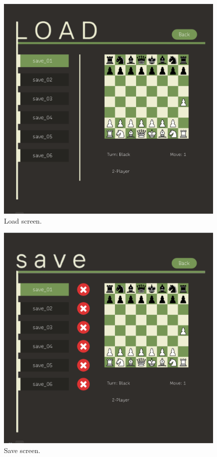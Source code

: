 \documentclass[a4paper, 10pt, titlepage]{report}
\begin{document}
  \begin{figure}%
    \includegraphics[width=\linewidth]{load_screen.png}
    \caption{Load screen.}
    \label{fig:third}
  \end{figure}%
  \hfill

  \begin{figure}%
    \includegraphics[width=\linewidth]{save_screen.png}
    \caption{Save screen.}
    \label{fig:fourth}
  \end{figure}%
  \hfill \break
\end{document}

